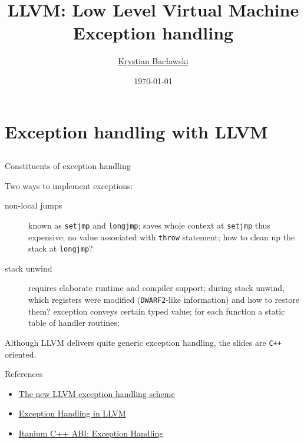 \documentclass[8pt]{beamer}
\title[LLVM]{LLVM: Low Level Virtual Machine\\Exception handling}
\author[Krystian Bacławski]{\href{mailto:cahirwpz@cs.uni.wroc.pl}{Krystian Bacławski}}
\institute{Computer Science Department\\University of Wrocław}
\date{\today}
\begin{document}
\begin{frame}
\titlepage
\end{frame}

\section[Exception handling]{Exception handling with LLVM}
\subsection*{}

\begin{frame}[fragile]{Constituents of exception handling}
  \begin{block}{Two ways to implement exceptions:}
    \begin{description}
      \item[non-local jumps] known as \texttt{setjmp} and \texttt{longjmp};
        saves whole context at \texttt{setjmp} thus expensive; no value
        associated with \texttt{throw} statement; how to clean up the stack at
        \texttt{longjmp}?
      \item[stack unwind] requires elaborate runtime and compiler support;
        during stack unwind, which registers were modified
        (\texttt{DWARF2}-like information) and how to restore them? exception
        conveys certain typed value; for each function a static table of
        handler routines;
    \end{description}
  \end{block}

  \begin{alertblock}{}
    Although LLVM delivers quite generic exception handling, the slides are
    \verb|C++| oriented.
  \end{alertblock}

  \begin{exampleblock}{References}
    \begin{itemize}
      \item
        \href{http://llvm.org/devmtg/2011-09-16/EuroLLVM2011-ExceptionHandling.pdf}{The
          new LLVM exception handling scheme}
      \item \href{http://llvm.org/docs/ExceptionHandling.html}{Exception Handling
          in LLVM}
      \item \href{http://mentorembedded.github.com/cxx-abi/abi-eh.html}{Itanium
          C++ ABI: Exception Handling}
    \end{itemize}
  \end{exampleblock}
\end{frame}
\end{document}
